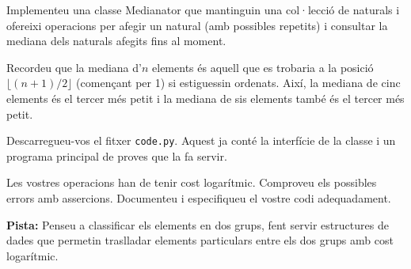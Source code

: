 

\Statement

Implementeu una classe Medianator que mantinguin una col·lecció de naturals i ofereixi operacions per afegir un natural (amb possibles repetits) i consultar la mediana dels naturals afegits fins al moment.

\medskip

Recordeu que la mediana d'$n$ elements és aquell que es trobaria a la posició $\lfloor  (n + 1)/2 \rfloor$ (començant per 1) si estiguessin ordenats. Així, la
mediana de cinc elements és el tercer més petit i la mediana de sis elements també és el tercer més petit.

\medskip

Descarregueu-vos el fitxer \texttt{code.py}. Aquest ja conté la interfície de la classe i un programa principal de proves que la fa servir.

\medskip

Les vostres operacions han de tenir cost logarítmic. Comproveu els possibles errors amb assercions. Documenteu i especifiqueu el vostre codi adequadament.

\medskip

\textbf{Pista:} Penseu a classificar els elements en dos grups, fent servir estructures de dades que permetin traslladar elements particulars entre els dos grups amb cost logarítmic.

\Sample
